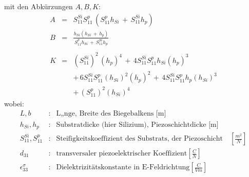 %
mit den Abkürzungen $ A, B, K $:
%
\begin{eqnarray*}
   A & = & S^{Si}_{11} S^{p}_{11} \, \left( S^{p}_{11} h_{Si} \, + \,
           S^{Si}_{11} h_{p} \right ) \\
   B & = & \frac{h_{Si} (h_{Si} \, + \, h_{p}) }{ S^{p}_{11} h_{Si} \,
               +  \, S^{Si}_{11} h_{p}} \\
     &   &   \nonumber  \\
   K & = & (S^{Si}_{11})^{2} \, (h_{p})^{4} \, + \, 4S^{Si}_{11}
                   S^{p}_{11} h_{Si}(h_{p})^{3} \nonumber \\
     &   & + \, 6S^{Si}_{11} S^{p}_{11}(h_{Si})^{2}(h_{p})^{2} \, + \,
                4S^{Si}_{11} S^{p}_{11} h_{p} (h_{Si})^{3} \nonumber \\
     &   & + \, (S^{p}_{11})^{2}(h_{Si})^{4}
 \end{eqnarray*}
%
wobei:
\begin{eqnarray*}
 L, b                      & : &
  \mbox{L„nge, Breite des Biegebalkens [m]} \\
 h_{Si},h_{p}              & : &
  \mbox{Substratdicke (hier Silizium), Piezoschichtdicke [m]}   \\
 S^{Si}_{11}, S^{p}_{11}   & : &
  \mbox{Steifigkeitskoeffizient des Substrats, der Piezoschicht}
  \quad \left [ \frac{m^{2}}{N} \right ] \\
 d_{31} & : & \mbox{transversaler piezoelektrischer Koeffizient}
  \left [ \frac{C}{N} \right ] \\
 \epsilon^{\sigma}_{33}    & : &
  \mbox{Dielektrizitätskonstante in E-Feldrichtung}
  \left [ \frac{C}{Vm}\right ]
\end{eqnarray*}

